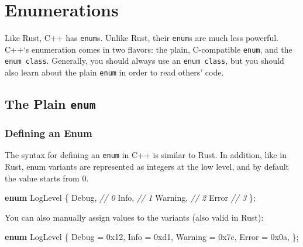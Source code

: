 \documentclass[
]{book}
\newenvironment{Shaded}{\begin{snugshade}}{\end{snugshade}}
\newcommand{\BaseNTok}[1]{\textcolor[rgb]{0.00,0.00,0.81}{#1}}
\newcommand{\CommentTok}[1]{\textcolor[rgb]{0.56,0.35,0.01}{\textit{#1}}}
\newcommand{\KeywordTok}[1]{\textcolor[rgb]{0.13,0.29,0.53}{\textbf{#1}}}
\newcommand{\NormalTok}[1]{#1}
\begin{document}
\hypertarget{enumerations}{%
\chapter{Enumerations}\label{enumerations}}

Like Rust, C++ has \texttt{enum}s. Unlike Rust, their \texttt{enum}s are much less powerful. C++`s enumeration
comes in two flavors: the plain, C-compatible \texttt{enum}, and the \texttt{enum\ class}. Generally, you should
always use an \texttt{enum\ class}, but you should also learn about the plain \texttt{enum} in order to read
others' code.

\hypertarget{the-plain-enum}{%
\section{\texorpdfstring{The Plain \texttt{enum}}{The Plain enum}}\label{the-plain-enum}}

\hypertarget{defining-an-enum}{%
\subsection{Defining an Enum}\label{defining-an-enum}}

The syntax for defining an \texttt{enum} in C++ is similar to Rust. In addition, like in Rust, enum
variants are represented as integers at the low level, and by default the value starts from 0.

\begin{Shaded}
\begin{Highlighting}[]
\KeywordTok{enum}\NormalTok{ LogLevel}
\NormalTok{\{}
\NormalTok{    Debug,   }\CommentTok{// 0}
\NormalTok{    Info,    }\CommentTok{// 1}
\NormalTok{    Warning, }\CommentTok{// 2}
\NormalTok{    Error    }\CommentTok{// 3}
\NormalTok{\};}
\end{Highlighting}
\end{Shaded}

You can also manually assign values to the variants (also valid in Rust):

\begin{Shaded}
\begin{Highlighting}[]
\KeywordTok{enum}\NormalTok{ LogLevel}
\NormalTok{\{}
\NormalTok{    Debug   = }\BaseNTok{0x12}\NormalTok{,}
\NormalTok{    Info    = }\BaseNTok{0xd1}\NormalTok{,}
\NormalTok{    Warning = }\BaseNTok{0x7c}\NormalTok{,}
\NormalTok{    Error   = }\BaseNTok{0x0a}\NormalTok{,}
\NormalTok{\};}
\end{Highlighting}
\end{Shaded}
\end{document}
